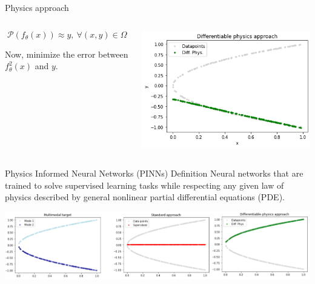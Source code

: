 \documentclass[aspectratio=1610,xcolor={dvipsnames},hyperref={colorlinks,unicode,linkcolor=violet,anchorcolor=BlueViolet,citecolor=YellowOrange,filecolor=black,urlcolor=Aquamarine}]{beamer}
\begin{document}
\begin{frame}[label={sec:orgaaaa784}]{Physics approach}
\begin{columns}
\begin{column}{0.4\columnwidth}
\[\mathcal{P}(f_{\theta}(x)) \approx y,\ \forall (x, y) \in \Omega\]

Now, minimize the error between \(f^{2}_{\theta}(x)\)  and \(y\).
\end{column}

\begin{column}{0.6\columnwidth}
\begin{center}
\includegraphics[width=.9\linewidth]{./p3.png}
\end{center}
\end{column}
\end{columns}
\end{frame}

\begin{frame}[label={sec:org3932c22}]{Physics Informed Neural Networks (PINNs) Definition}
Neural networks that are trained to solve supervised learning tasks
while respecting any given law of physics described by general
nonlinear partial differential equations (PDE).

\begin{center}
\includegraphics[width=.9\linewidth]{./p4.png}
\end{center}
\end{frame}
\end{document}
